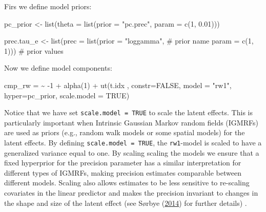 \documentclass[
  letterpaper,
  DIV=11,
  numbers=noendperiod]{scrartcl}
\newenvironment{Shaded}{\begin{snugshade}}{\end{snugshade}}
\newcommand{\AttributeTok}[1]{\textcolor[rgb]{0.40,0.45,0.13}{#1}}
\newcommand{\CommentTok}[1]{\textcolor[rgb]{0.37,0.37,0.37}{#1}}
\newcommand{\ConstantTok}[1]{\textcolor[rgb]{0.56,0.35,0.01}{#1}}
\newcommand{\DecValTok}[1]{\textcolor[rgb]{0.68,0.00,0.00}{#1}}
\newcommand{\ErrorTok}[1]{\textcolor[rgb]{0.68,0.00,0.00}{#1}}
\newcommand{\FloatTok}[1]{\textcolor[rgb]{0.68,0.00,0.00}{#1}}
\newcommand{\FunctionTok}[1]{\textcolor[rgb]{0.28,0.35,0.67}{#1}}
\newcommand{\NormalTok}[1]{\textcolor[rgb]{0.00,0.23,0.31}{#1}}
\newcommand{\OtherTok}[1]{\textcolor[rgb]{0.00,0.23,0.31}{#1}}
\newcommand{\SpecialCharTok}[1]{\textcolor[rgb]{0.37,0.37,0.37}{#1}}
\newcommand{\StringTok}[1]{\textcolor[rgb]{0.13,0.47,0.30}{#1}}
\begin{document}
Firs we define model priors:

\begin{Shaded}
\begin{Highlighting}[]
\NormalTok{pc\_prior }\OtherTok{\textless{}{-}} \FunctionTok{list}\NormalTok{(}\AttributeTok{theta =} \FunctionTok{list}\NormalTok{(}\AttributeTok{prior =} \StringTok{"pc.prec"}\NormalTok{, }\AttributeTok{param =} \FunctionTok{c}\NormalTok{(}\DecValTok{1}\NormalTok{, }\FloatTok{0.01}\NormalTok{))) }

\NormalTok{prec.tau\_e }\OtherTok{\textless{}{-}} \FunctionTok{list}\NormalTok{(}\AttributeTok{prec =} \FunctionTok{list}\NormalTok{(}\AttributeTok{prior =} \StringTok{"loggamma"}\NormalTok{,   }\CommentTok{\# prior name}
                             \AttributeTok{param =} \FunctionTok{c}\NormalTok{(}\DecValTok{1}\NormalTok{, }\DecValTok{1}\NormalTok{))) }\CommentTok{\# prior values}
\end{Highlighting}
\end{Shaded}

Now we define model components:

\begin{Shaded}
\begin{Highlighting}[]
\NormalTok{cmp\_rw }\OtherTok{=}  \ErrorTok{\textasciitilde{}} \SpecialCharTok{{-}}\DecValTok{1} \SpecialCharTok{+} \FunctionTok{alpha}\NormalTok{(}\DecValTok{1}\NormalTok{) }\SpecialCharTok{+} 
  \FunctionTok{ut}\NormalTok{(t.idx ,}
     \AttributeTok{constr=}\ConstantTok{FALSE}\NormalTok{,}
     \AttributeTok{model =} \StringTok{"rw1"}\NormalTok{,}
     \AttributeTok{hyper=}\NormalTok{pc\_prior,}
     \AttributeTok{scale.model =} \ConstantTok{TRUE}\NormalTok{)}
\end{Highlighting}
\end{Shaded}

Notice that we have set \texttt{scale.model\ =\ TRUE} to scale the
latent effects. This is particularly important when Intrinsic Gaussian
Markov random fields (IGMRFs) are used as priors (e.g., random walk
models or some spatial models) for the latent effects. By defining
\texttt{scale.model\ =\ TRUE}, the \texttt{rw1}-model is scaled to have
a generalized variance equal to one. By scaling scaling the models we
ensure that a fixed hyperprior for the precision parameter has a similar
interpretation for different types of IGMRFs, making precision estimates
comparable between different models. Scaling also allows estimates to be
less sensitive to re-scaling covariates in the linear predictor and
makes the precision invariant to changes in the shape and size of the
latent effect (see Sørbye
(\href{https://www.sciencedirect.com/science/article/pii/S2211675313000407}{2014})
for further details) .
\end{document}
